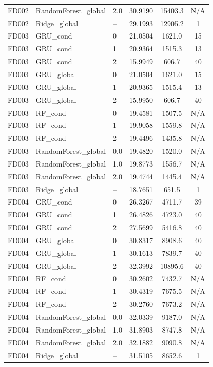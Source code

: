 \begin{table}[t]
\begin{tabular}{lllccc}
FD002 & RandomForest\_global & 2.0 & 30.9190 & 15403.3 & N/A \\
FD002 & Ridge\_global & -- & 29.1993 & 12905.2 & 1 \\
\midrule
FD003 & GRU\_cond & 0 & 21.0504 & 1621.0 & 15 \\
FD003 & GRU\_cond & 1 & 20.9364 & 1515.3 & 13 \\
FD003 & GRU\_cond & 2 & 15.9949 & 606.7 & 40 \\
FD003 & GRU\_global & 0 & 21.0504 & 1621.0 & 15 \\
FD003 & GRU\_global & 1 & 20.9365 & 1515.4 & 13 \\
FD003 & GRU\_global & 2 & 15.9950 & 606.7 & 40 \\
FD003 & RF\_cond & 0 & 19.4581 & 1507.5 & N/A \\
FD003 & RF\_cond & 1 & 19.9058 & 1559.8 & N/A \\
FD003 & RF\_cond & 2 & 19.4496 & 1435.8 & N/A \\
FD003 & RandomForest\_global & 0.0 & 19.4820 & 1520.0 & N/A \\
FD003 & RandomForest\_global & 1.0 & 19.8773 & 1556.7 & N/A \\
FD003 & RandomForest\_global & 2.0 & 19.4744 & 1445.4 & N/A \\
FD003 & Ridge\_global & -- & 18.7651 & 651.5 & 1 \\
\midrule
FD004 & GRU\_cond & 0 & 26.3267 & 4711.7 & 39 \\
FD004 & GRU\_cond & 1 & 26.4826 & 4723.0 & 40 \\
FD004 & GRU\_cond & 2 & 27.5699 & 5416.8 & 40 \\
FD004 & GRU\_global & 0 & 30.8317 & 8908.6 & 40 \\
FD004 & GRU\_global & 1 & 30.1613 & 7839.7 & 40 \\
FD004 & GRU\_global & 2 & 32.3992 & 10895.6 & 40 \\
FD004 & RF\_cond & 0 & 30.2602 & 7432.7 & N/A \\
FD004 & RF\_cond & 1 & 30.4319 & 7675.5 & N/A \\
FD004 & RF\_cond & 2 & 30.2760 & 7673.2 & N/A \\
FD004 & RandomForest\_global & 0.0 & 32.0339 & 9187.0 & N/A \\
FD004 & RandomForest\_global & 1.0 & 31.8903 & 8747.8 & N/A \\
FD004 & RandomForest\_global & 2.0 & 32.1882 & 9090.8 & N/A \\
FD004 & Ridge\_global & -- & 31.5105 & 8652.6 & 1 \\
\bottomrule
\end{tabular}
\end{table}
